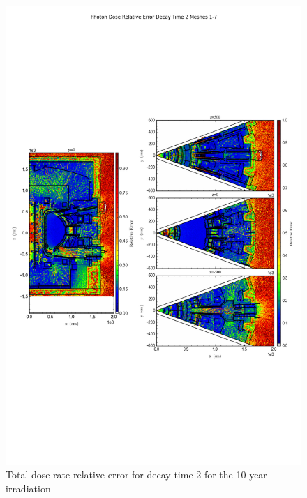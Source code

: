 \documentclass[12pt]{article}
\begin{document}
\begin{figure}[ht!]
\centering
\includegraphics[trim={0cm 8cm, 0cm 8cm},clip,scale=0.75]{../plots/final_model_with_b4c/10year/Photon_Dose_Relative_Error_Decay_Time_2_Meshes_1-7.png}
\caption{Total dose rate relative error for decay time 2 for the 10 year irradiation}
\label{fig:photons_10y_dc2_nob4c_relerr}
\end{figure}
\end{document}
